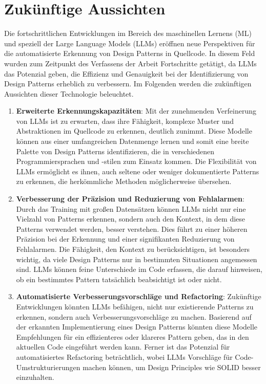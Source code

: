 \section{Zukünftige Aussichten}

Die fortschrittlichen Entwicklungen im Bereich des maschinellen Lernens (ML) und speziell der Large Language Models (LLMs) eröffnen neue Perspektiven für die automatisierte Erkennung von Design Patterns in Quellcode. In diesem Feld wurden zum Zeitpunkt des Verfassens der Arbeit Fortschritte getätigt, da LLMs das Potenzial geben, die Effizienz und Genauigkeit bei der Identifizierung von Design Patterns erheblich zu verbessern. Im Folgenden werden die zukünftigen Aussichten dieser Technologie beleuchtet.

\begin{enumerate}
    \item \textbf{Erweiterte Erkennungskapazitäten}: Mit der zunehmenden Verfeinerung von LLMs ist zu erwarten, dass ihre Fähigkeit, komplexe Muster und Abstraktionen im Quellcode zu erkennen, deutlich zunimmt. Diese Modelle können aus einer umfangreichen Datenmenge lernen und somit eine breite Palette von Design Patterns identifizieren, die in verschiedenen Programmiersprachen und -stilen zum Einsatz kommen. Die Flexibilität von LLMs ermöglicht es ihnen, auch seltene oder weniger dokumentierte Patterns zu erkennen, die herkömmliche Methoden möglicherweise übersehen.
    \item \textbf{Verbesserung der Präzision und Reduzierung von Fehlalarmen}: Durch das Training mit großen Datensätzen können LLMs nicht nur eine Vielzahl von Patterns erkennen, sondern auch den Kontext, in dem diese Patterns verwendet werden, besser verstehen. Dies führt zu einer höheren Präzision bei der Erkennung und einer signifikanten Reduzierung von Fehlalarmen. Die Fähigkeit, den Kontext zu berücksichtigen, ist besonders wichtig, da viele Design Patterns nur in bestimmten Situationen angemessen sind. LLMs können feine Unterschiede im Code erfassen, die darauf hinweisen, ob ein bestimmtes Pattern tatsächlich beabsichtigt ist oder nicht.
    \item \textbf{Automatisierte Verbesserungsvorschläge und Refactoring}: Zukünftige Entwicklungen könnten LLMs befähigen, nicht nur existierende Patterns zu erkennen, sondern auch Verbesserungsvorschläge zu machen. Basierend auf der erkannten Implementierung eines Design Patterns könnten diese Modelle Empfehlungen für ein effizienteres oder klareres Pattern geben, das in den aktuellen Code eingeführt werden kann. Ferner ist das Potenzial für automatisiertes Refactoring beträchtlich, wobei LLMs Vorschläge für Code-Umstrukturierungen machen können, um Design Principles wie SOLID besser einzuhalten.

\end{enumerate}
